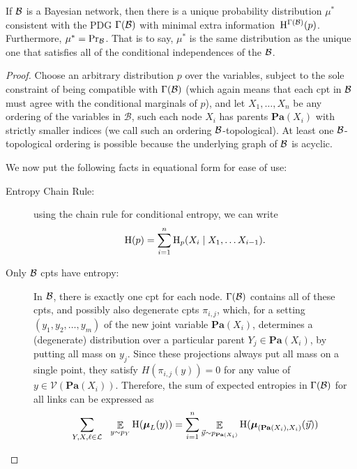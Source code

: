 \documentclass{article}
\newcommand{\bmu}{\boldsymbol{\mu}}
\newcommand{\V}{\mathcal V}
\def\Pa{\mathbf{Pa}}
\def\extrainfo{extra information}
\begin{document}
\begin{theorem}\label{thm:bns-are-pdgs}
	If $\cal B$ is a Bayesian network, then there is a unique probability distribution $\mu^*$ consistent with the PDG $\Gamma(\cal B)$ with minimal \extrainfo\ $\mathrm{H}^{\Gamma(\mathcal B)}(p)$. Furthermore, $\mu^* = \Pr_{\cal B}$. That is to say, $\mu^*$ is the same distribution as the unique one that satisfies all of the conditional independences of the $\cal B$.	
\end{theorem}
\begin{proof}%
	Choose an arbitrary distribution $p$ over the variables, subject to the sole constraint of being compatible with $\Gamma(\cal B)$ (which again means that each cpt in $\cal B$ must agree with the conditional marginals of $p$), and let $X_1, \ldots, X_n$ be any ordering of the variables in $\mathcal B$, such each node $X_i$ has parents $\Pa(X_i)$ with strictly smaller indices (we call such an ordering $\cal B$-topological). At least one $\cal B$-topological ordering is possible because the underlying graph of $\cal B$ is acyclic. 
	
	We now put the following facts in equational form for ease of use:
	\begin{description}
	\item[Entropy Chain Rule:] using the chain rule for conditional entropy, we can write 
	\[ \mathrm{H}(p) = \sum_{i = 1}^n \mathrm{H}_p(X_i \mid X_1, \ldots X_{i-1}). \]
	\item[Only $\cal B$ cpts have entropy:]
	In $\cal B$, there is exactly one cpt for each node. $\Gamma(\cal B)$ contains all of these cpts, and possibly also degenerate cpts $\pi_{i,j}$, which, for a setting $(y_1, y_2, \ldots, y_m)$ of the new joint variable $\Pa(X_i)$, determines a (degenerate) distribution over a particular parent $Y_j \in \Pa(X_i)$, by putting all mass on $y_j$. Since these projections always put all mass on a single point, they satisfy $H(\pi_{i,j}(y)) = 0$ for any value of $y \in \V(\Pa(X_i))$. Therefore, the sum of expected entropies in $\Gamma(\cal B)$ for all links can be expressed as
	\[\sum_{Y,X, \ell \in \cal L} ~~\E_{y \sim p_Y}  \H (\bmu_L ( y)) = \sum_{i=1}^n\E_{\vec y \sim p_{\Pa(X_i)}}  \H (\bmu_{(\Pa(X_i),X_i)} (\vec y))\]
	

\end{description}
\end{proof}
\end{document}
